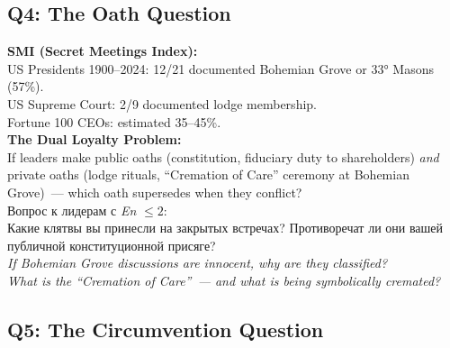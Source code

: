 \documentclass[11pt,a4paper]{article}
\theoremstyle{definition}
\theoremstyle{remark}
\begin{document}
\subsection{Q4: The Oath Question}
\label{sec:q4}

\begin{tcolorbox}[enhanced, breakable,
  colback=gray!5, colframe=black!60,
  title={\textbf{Q4 — Secret Oaths:}
    \textit{Which oath supersedes~---
    the constitutional or the lodge?}},
  fonttitle=\bfseries, boxrule=1pt]

\textbf{SMI (Secret Meetings Index):}\\
US Presidents 1900--2024: 12/21 documented
Bohemian Grove or 33° Masons (57\%).\\
US Supreme Court: 2/9 documented lodge membership.\\
Fortune 100 CEOs: estimated 35--45\%.\\[0.2cm]

\textbf{The Dual Loyalty Problem:}\\
If leaders make public oaths (constitution,
fiduciary duty to shareholders)
\textit{and} private oaths (lodge rituals,
``Cremation of Care'' ceremony at Bohemian Grove)~---
which oath supersedes when they conflict?\\[0.2cm]

\foreignlanguage{russian}{
Вопрос к лидерам с \textit{En} $\leq 2$:\\
Какие клятвы вы принесли на закрытых встречах?
Противоречат ли они вашей публичной конституционной присяге?\\[0.1cm]
}
\textit{If Bohemian Grove discussions are innocent,
why are they classified?\\
What is the ``Cremation of Care''~---
and what is being symbolically cremated?}
\end{tcolorbox}

\subsection{Q5: The Circumvention Question}
\label{sec:q5}
\end{document}
